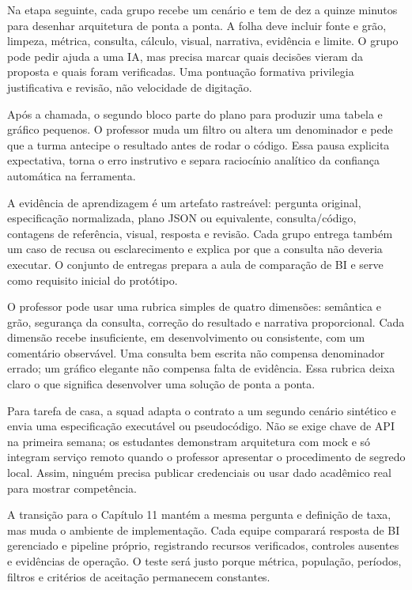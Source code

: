 Na etapa seguinte, cada grupo recebe um cenário e tem de dez a quinze minutos para desenhar arquitetura de ponta a ponta. A folha deve incluir fonte e grão, limpeza, métrica, consulta, cálculo, visual, narrativa, evidência e limite. O grupo pode pedir ajuda a uma IA, mas precisa marcar quais decisões vieram da proposta e quais foram verificadas. Uma pontuação formativa privilegia justificativa e revisão, não velocidade de digitação.

Após a chamada, o segundo bloco parte do plano para produzir uma tabela e gráfico pequenos. O professor muda um filtro ou altera um denominador e pede que a turma antecipe o resultado antes de rodar o código. Essa pausa explicita expectativa, torna o erro instrutivo e separa raciocínio analítico da confiança automática na ferramenta.

A evidência de aprendizagem é um artefato rastreável: pergunta original, especificação normalizada, plano JSON ou equivalente, consulta/código, contagens de referência, visual, resposta e revisão. Cada grupo entrega também um caso de recusa ou esclarecimento e explica por que a consulta não deveria executar. O conjunto de entregas prepara a aula de comparação de BI e serve como requisito inicial do protótipo.

O professor pode usar uma rubrica simples de quatro dimensões: semântica e grão, segurança da consulta, correção do resultado e narrativa proporcional. Cada dimensão recebe insuficiente, em desenvolvimento ou consistente, com um comentário observável. Uma consulta bem escrita não compensa denominador errado; um gráfico elegante não compensa falta de evidência. Essa rubrica deixa claro o que significa desenvolver uma solução de ponta a ponta.

Para tarefa de casa, a squad adapta o contrato a um segundo cenário sintético e envia uma especificação executável ou pseudocódigo. Não se exige chave de API na primeira semana; os estudantes demonstram arquitetura com mock e só integram serviço remoto quando o professor apresentar o procedimento de segredo local. Assim, ninguém precisa publicar credenciais ou usar dado acadêmico real para mostrar competência.

A transição para o Capítulo 11 mantém a mesma pergunta e definição de taxa, mas muda o ambiente de implementação. Cada equipe comparará resposta de BI gerenciado e pipeline próprio, registrando recursos verificados, controles ausentes e evidências de operação. O teste será justo porque métrica, população, períodos, filtros e critérios de aceitação permanecem constantes.


